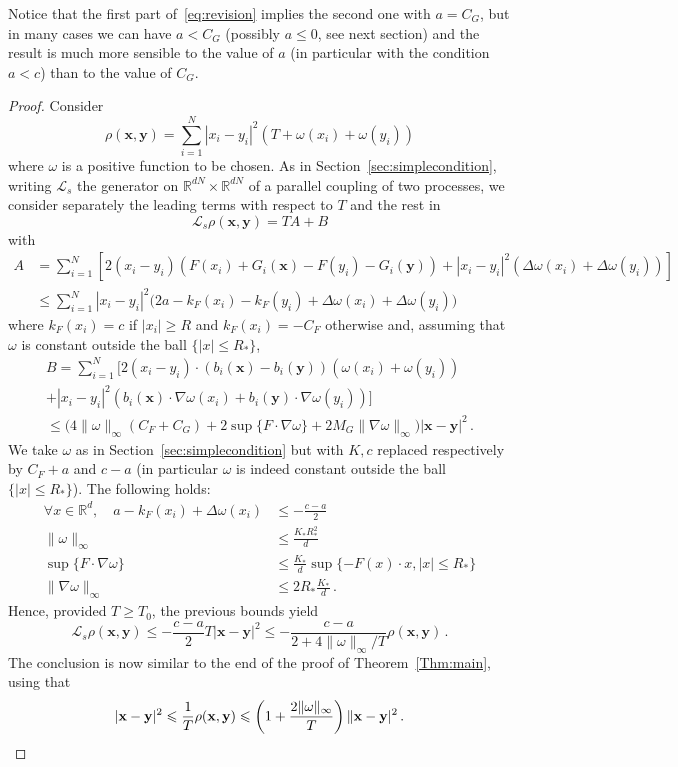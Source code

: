 \documentclass[10pt]{amsart}
\theoremstyle{definition}\newtheorem{defi}[theo]{Definition}\newtheorem{rema}[theo]{Remark}\newtheorem{exam}[theo]{Example}\newtheorem{exem}[theo]{Example}\newtheorem{nota}[theo]{Notation}
\newcommand{\R}{\mathbb R}
\newcommand{\clL}{\mathcal L}
\newcommand{\na}{\nabla}
\newcommand{\1}{\mathbbm{1}}
\newcommand{\bx}{\mathbf{x}}
\newcommand{\by}{\mathbf{y}}
\newcommand{\nv}[1]{#1}
\let\oldforall\forall
\renewcommand*{\forall}{\mathrel{\oldforall}}
\begin{document}
Notice that the first part of~\eqref{eq:revision} implies the second one with $a = C_G$, but in many cases we can have $a<C_G$ (possibly $a\leqslant 0$, see next section) and the result is much more sensible to the value of $a$ (in particular with the condition $a<c$) than to the value of $C_G$.

\begin{proof}
Consider
\[
\rho(\bx,\by) = \sum_{i=1}^N |x_i-y_i|^{2} \left( T + \nv{\omega}(x_i)+ \nv{\omega}(y_i)\right)
\]
where $\nv{\omega}$ is a positive function to be chosen. As in Section~\ref{sec:simplecondition}, writing $\clL_s$ the generator on $\R^{dN}\times\R^{dN}$ of a parallel coupling of two processes, we consider separately the leading terms with respect to $T$ and the rest in
\[
\clL_s \rho(\bx,\by) = TA+B
\]
with
\begin{align*}
A &= \sum_{i=1}^N \left[ 2(x_i-y_i) \left( F(x_i)+G_i(\bx)-F(y_i)-G_i(\by)\right) + |x_i-y_i|^2 \left( \Delta \nv{\omega}(x_i)+\Delta\nv{\omega}(y_i)\right)\right] \\
& \leqslant \sum_{i=1}^N |x_i-y_i|^2 \big( 2a-k_F(x_i)-k_F(y_i) + \Delta \nv{\omega}(x_i)+\Delta\nv{\omega}(y_i)\big)
\end{align*}
where $k_F(x_i)=c$ if $|x_i|\geqslant R$ and $k_F(x_i)=-C_F$ otherwise and, assuming that $\omega$ is constant outside the ball $\{|x|\leqslant R_*\}$,
\begin{multline*}
B = \sum_{i=1}^N \big[2 (x_i-y_i)\cdot \left( b_i(\bx)-b_i(\by)\right) \left( \nv{\omega}(x_i)+\nv{\omega}(y_i)\right)\\
 + |x_i-y_i|^2\left( b_i(\bx)\cdot \na \nv{\omega}(x_i)+b_i(\by)\cdot \na \nv{\omega}(y_i)\right)\big]\\
\leqslant \big( 4\|\nv{\omega}\|_\infty \left( C_F+C_G\right) + 2\sup\{F\cdot\na \nv{\omega}\} + 2M_G\|\na\nv{\omega}\|_\infty\big) |\bx-\by|^2 \,.
\end{multline*}
We take $\nv{\omega}$ as in Section~\ref{sec:simplecondition} but with $K,c$ replaced respectively by $C_F+a$ and $c-a$ \nv{(in particular $\omega$ is indeed constant outside the ball $\{|x|\leqslant R_*\}$)}. The following holds:
\begin{align*}
\forall x\in\R^d,\quad a - k_F(x_i) + \Delta \nv{\omega}(x_i) & \leqslant - \frac{c-a}{2}\\
\|\nv{\omega}\|_\infty &\leqslant \frac{K_* R_*^2}{d} \\
\sup\{F\cdot\na \nv{\omega}\} &\leqslant \frac{K_*}{d} \sup\{-F(x)\cdot x, |x|\leqslant R_*\}\\
\|\na \nv{\omega}\|_\infty &\leqslant 2R_* \frac{K_*}{d}\,.
\end{align*}
Hence, provided $T\geqslant T_0$, the previous bounds yield
\[
\clL_s \rho(\bx,\by) \leqslant -\frac{c-a}2 T|\bx-\by|^2 \leqslant -\frac{c-a}{2+4\|\nv{\omega}\|_\infty/T} \rho(\bx,\by)\,.
\]
The conclusion is now similar to the end of the proof of Theorem~\ref{Thm:main}, using that
\[
|\bx-\by|^2 \leqslant \frac1T \rho(\bx,\by) \leqslant \left( 1+\frac{2\|\nv{\omega}\|_\infty}T\right)\|\bx-\by|^2\,.\qedhere
\]
\end{proof}
\end{document}
